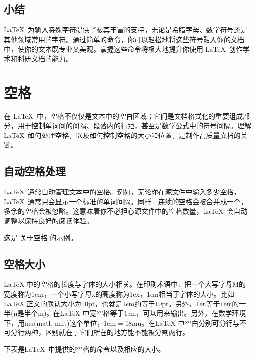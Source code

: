 {\subsection{小结}
\LaTeX\ 为输入特殊字符提供了极其丰富的支持，无论是希腊字母、数学符号还是其他领域常用的字符。通过简单的命令，你可以轻松地将这些符号融入你的文档中，使你的文本既专业又美观。掌握这些命令将极大地提升你使用 \LaTeX\ 创作学术和科研文档的能力。

\section{空格}
在 \LaTeX\ 中，空格不仅仅是文本中的空白区域；它们是文档格式化的重要组成部分，用于控制单词间的间隔、段落内的行距，甚至是数学公式中的符号间隔。理解 \LaTeX\ 如何处理空格，以及如何控制空格的大小和位置，是制作高质量文档的关键。
\subsection{自动空格处理}
\LaTeX\ 通常自动管理文本中的空格。例如，无论你在源文件中输入多少空格，\LaTeX\ 通常只会显示一个标准的单词间隔。同样，连续的空格会被合并成一个，多余的空格会被忽略。这意味着你不必担心源文件中的空格数量，\LaTeX\ 会自动调整以保持良好的阅读体验。
\begin{texlst}
	这是 关于空格    的示例。
\end{texlst}

\subsection{空格大小}
\LaTeX
中的空格的长度与字体的大小相关。在印刷术语中，把一个大写字母M的宽度称为1em，一个小写字母x的高度称为1ex，1em相当于字体的大小。比如\LaTeX
正文的默认大小为10pt，也就是1em约等于10pt。另外，1en等于1em的一半(n是半个m)。在\LaTeX
中宽空格等于1em，可以用\texinline{\quad}来输出。另外，在数学环境下，用mu(math unit)这个单位，$1\text{em}=18\text{mu}$。在\LaTeX
中空白分别可分行与不可分行两种，区别就在于它们所在的地方能不能被分割两行。

下表是\LaTeX\ 中提供的空格的命令以及相应的大小。

}

